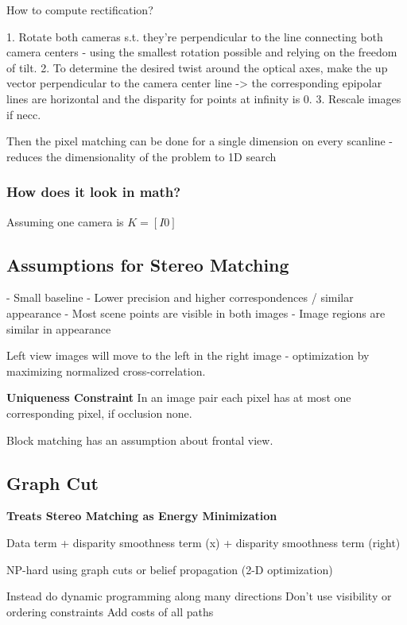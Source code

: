 How to compute rectification?

1. Rotate both cameras s.t. they're perpendicular to the line connecting both camera centers - using the smallest rotation possible and relying on the freedom of tilt. 
2. To determine the desired twist around the optical axes, make the up vector perpendicular to the camera center line -> the corresponding epipolar lines are horizontal and the disparity for points at infinity is 0. 
3. Rescale images if necc.

Then the pixel matching can be done for a single dimension on every scanline - reduces the dimensionality of the problem to 1D search

\subsubsection{How does it look in math?}

Assuming one camera is $K = [ I 0]$


\subsection{Assumptions for Stereo Matching}

- Small baseline
  - Lower precision and higher correspondences  / similar appearance
- Most scene points are visible in both images
- Image regions are similar in appearance

Left view images will move to the left in the right image - optimization by maximizing normalized cross-correlation.

\textbf{Uniqueness Constraint} 
In an image pair each pixel has at most one corresponding pixel, if occlusion none.

Block matching has an assumption about frontal view.

\subsection{Graph Cut}

\textbf{Treats Stereo Matching as Energy Minimization}

Data term + disparity smoothness term (x) + disparity smoothness term (right)

NP-hard using graph cuts or belief propagation (2-D optimization)

Instead do dynamic programming along many directions
Don’t use visibility or ordering constraints
Add costs of all paths

